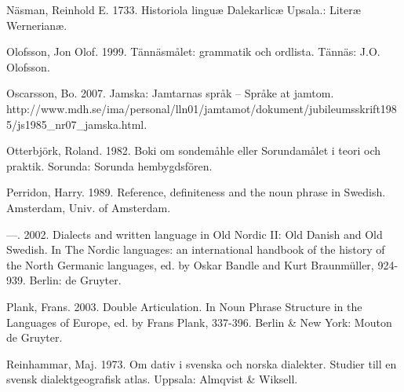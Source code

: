 \begin{styleBodytextC}
Näsman, Reinhold E. 1733. Historiola linguæ Dalekarlicæ Upsala.: Literæ Wernerianæ.

\end{styleBodytextC}

\begin{styleBodytextC}
Olofsson, Jon Olof. 1999. Tännäsmålet: grammatik och ordlista. Tännäs: J.O. Olofsson.

\end{styleBodytextC}

\begin{styleBodytextC}
Oscarsson, Bo. 2007. Jamska: Jamtarnas språk  –  Språke at jamtom. http://www.mdh.se/ima/personal/lln01/jamtamot/dokument/jubileumsskrift1985/js1985\_nr07\_jamska.html. 

\end{styleBodytextC}

\begin{styleBodytextC}
Otterbjörk, Roland. 1982. Boki om sondemåhle eller Sorundamålet i teori och praktik. Sorunda: Sorunda hembygdsfören.

\end{styleBodytextC}

\begin{styleBodytextC}
Perridon, Harry. 1989. Reference, definiteness and the noun phrase in Swedish. Amsterdam, Univ. of Amsterdam.

\end{styleBodytextC}

\begin{styleBodytextC}
—. 2002. Dialects and written language in Old Nordic II: Old Danish and Old Swedish. In The Nordic languages: an international handbook of the history of the North Germanic languages, ed. by Oskar Bandle and Kurt Braunmüller, 924-939. Berlin: de Gruyter.

\end{styleBodytextC}

\begin{styleBodytextC}
Plank, Frans. 2003. Double Articulation. In Noun Phrase Structure in the Languages of Europe, ed. by Frans Plank, 337-396. Berlin \& New York: Mouton de Gruyter.

\end{styleBodytextC}

\begin{styleBodytextC}
Reinhammar, Maj. 1973. Om dativ i svenska och norska dialekter. Studier till en svensk dialektgeografisk atlas. Uppsala: Almqvist \& Wiksell.

\end{styleBodytextC}

